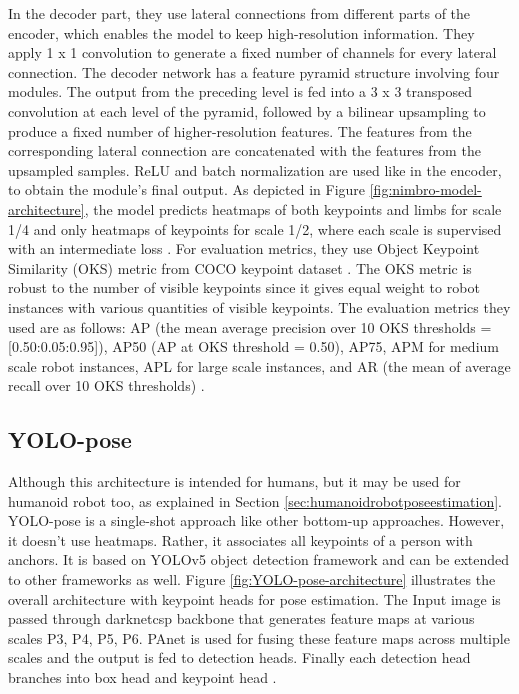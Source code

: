 In the decoder part, they use lateral connections from different parts of the encoder, which enables the model to keep high-resolution information. They apply 1 x 1 convolution to generate a fixed number of channels for every lateral connection.
The decoder network has a feature pyramid structure involving four modules. The output from the preceding level is fed into a 3 x 3 transposed convolution at each level of the pyramid, followed by a bilinear upsampling to produce a fixed number of higher-resolution features.
The features from the corresponding lateral connection are concatenated with the features from the upsampled samples. ReLU and batch normalization are used like in the encoder, to obtain the module's final output.
As depicted in Figure \ref{fig:nimbro-model-architecture}, the model predicts heatmaps of both keypoints and limbs for scale 1/4 and only
heatmaps of keypoints for scale 1/2, where each scale is supervised with an intermediate loss \parencite{amini2021}.
For evaluation metrics, they use Object Keypoint Similarity (OKS) metric from COCO keypoint dataset \parencite{ronchi2017}.
The OKS metric is robust to the number of visible keypoints since it gives equal weight to robot instances with various quantities of visible keypoints.
The evaluation metrics they used are as follows: AP (the mean average precision over 10 OKS thresholds = [0.50:0.05:0.95]), AP50
(AP at OKS threshold = 0.50), AP75, APM for medium scale robot instances, APL for large scale instances, and AR (the mean of average recall over 10 OKS thresholds) \parencite{amini2021}.

\subsection{YOLO-pose}
\label{subsec:yolopose}

Although this architecture is intended for humans, but it may be used for humanoid robot too, as explained in Section \ref{sec:humanoidrobotposeestimation}.
YOLO-pose is a single-shot approach like other bottom-up approaches. However, it doesn't use heatmaps. Rather, it associates all keypoints of a person with anchors. It is
based on YOLOv5 object detection framework and can be extended to other frameworks as well. Figure \ref{fig:YOLO-pose-architecture} illustrates the overall architecture with keypoint
heads for pose estimation. The Input image is passed through darknetcsp backbone that generates feature maps at
various scales {P3, P4, P5, P6}. PAnet is used for fusing these feature maps across multiple scales and the output is fed to detection
heads. Finally each detection head branches into box head and keypoint head \parencite{maji2022yolopose}.

